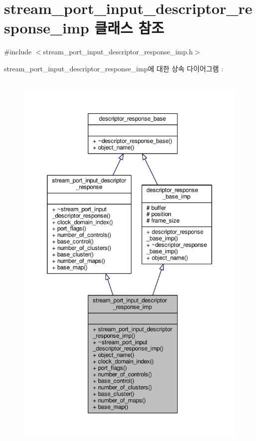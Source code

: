 \hypertarget{classavdecc__lib_1_1stream__port__input__descriptor__response__imp}{}\section{stream\+\_\+port\+\_\+input\+\_\+descriptor\+\_\+response\+\_\+imp 클래스 참조}
\label{classavdecc__lib_1_1stream__port__input__descriptor__response__imp}


{\ttfamily \#include $<$stream\+\_\+port\+\_\+input\+\_\+descriptor\+\_\+response\+\_\+imp.\+h$>$}



stream\+\_\+port\+\_\+input\+\_\+descriptor\+\_\+response\+\_\+imp에 대한 상속 다이어그램 \+: 
\nopagebreak
\begin{figure}[H]
\begin{center}
\leavevmode
\includegraphics[height=550pt]{classavdecc__lib_1_1stream__port__input__descriptor__response__imp__inherit__graph}
\end{center}
\end{figure}


